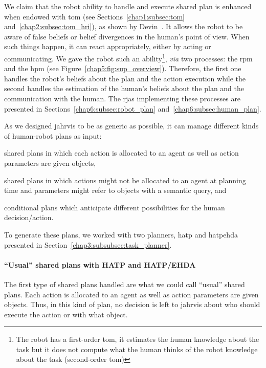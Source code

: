 \documentclass[a4paper,11pt,twoside]{StyleThese}
\begin{document}
We claim that the robot ability to handle and execute shared plan is enhanced when endowed with \acrfull{tom} (see Sections~\ref{chap1:subsec:tom} and~\ref{chap2:subsec:tom_hri}), as shown by Devin~\cite{devin_2016_implemented}. It allows the robot to be aware of false beliefs or belief divergences in the human's point of view. When such things happen, it can react appropriately, either by acting or communicating. We gave the robot such an ability\footnote{The robot has a first-order \acrshort{tom}, it estimates the human knowledge about the task but it does not compute what the human thinks of the robot knowledge about the task (second-order \acrshort{tom})}, \textit{via} two processes: the \acrfull{rpm} and the \acrfull{hpm} (see Figure~\ref{chap5:fig:sup_overview}). Therefore, the first one handles the robot's beliefs about the plan and the action execution while the second handles the estimation of the human's beliefs about the plan and the communication with the human. The \acrshort{rja}s implementing these processes are presented in Sections~\ref{chap6:subsec:robot_plan} and~\ref{chap6:subsec:human_plan}.

As we designed \acrshort{jahrvis} to be as generic as possible, it can manage different kinds of human-robot plans as input: 
\begin{bulletList}
	\item shared plans in which each action is allocated to an agent as well as action parameters are given objects,
	\item shared plans in which actions might not be allocated to an agent at planning time and parameters might refer to objects with a semantic query, and
	\item conditional plans which anticipate different possibilities for the human decision/action. 
\end{bulletList} 

To generate these plans, we worked with two planners, \acrshort{hatp} and \acrshort{hatpehda} presented in Section~\ref{chap3:subsubsec:task_planner}.

\paragraph{``Usual'' shared plans with HATP and HATP/EHDA} The first type of shared plans handled are what we could call ``usual'' shared plans. Each action is allocated to an agent as well as action parameters are given objects. Thus, in this kind of plan, no decision is left to \acrshort{jahrvis} about who should execute the action or with what object.
\end{document}
